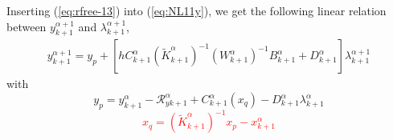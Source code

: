 Inserting (\ref{eq:rfree-13}) into (\ref{eq:NL11y}), we get the following linear relation between $y^{\alpha+1}_{k+1}$ and $\lambda^{\alpha+1}_{k+1}$, 
\begin{equation}
   \begin{array}{l}
 y^{\alpha+1}_{k+1} = y_p + \left[ h  C^{\alpha}_{k+1} (\tilde K^{\alpha}_{k+1})^{-1}( W^{\alpha}_{k+1})^{-1}  B^{\alpha}_{k+1} + D^{\alpha}_{k+1} \right]\lambda^{\alpha+1}_{k+1}
   \end{array}
\end{equation}
with 
\begin{equation}\boxed{
y_p = y^{\alpha}_{k+1} -\mathcal R^{\alpha}_{yk+1} + C^{\alpha}_{k+1}(x_q) -
D^{\alpha}_{k+1} \lambda^{\alpha}_{k+1} }
\end{equation}
\textcolor{red}{
  \begin{equation}
   \boxed{ x_q=(\tilde K^{\alpha}_{k+1})^{-1}x_p -x^{\alpha}_{k+1}\label{eq:xqq}}
  \end{equation}
}











